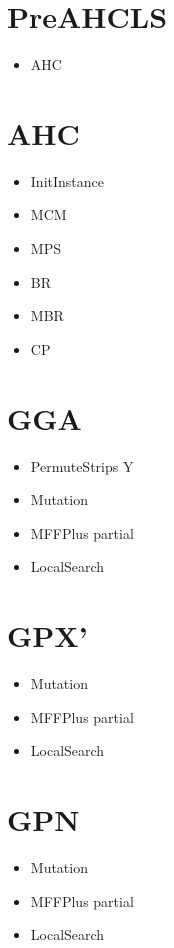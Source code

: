 \documentclass{elsarticle}
\begin{document}
\section{PreAHCLS}
\begin{itemize}
	\item AHC
\end{itemize}

\section{AHC}
\begin{itemize}
	\item InitInstance
	\item MCM
	\item MPS
	\item BR
	\item MBR
	\item CP
\end{itemize}

\section{GGA}
\begin{itemize}
	\item PermuteStrips Y
	\item Mutation
	\item MFFPlus partial
	\item LocalSearch
\end{itemize}

\section{GPX'}
\begin{itemize}
	\item Mutation
	\item MFFPlus partial
	\item LocalSearch
\end{itemize}

\section{GPN}
\begin{itemize}
	\item Mutation
	\item MFFPlus partial
	\item LocalSearch
\end{itemize}
\end{document}
